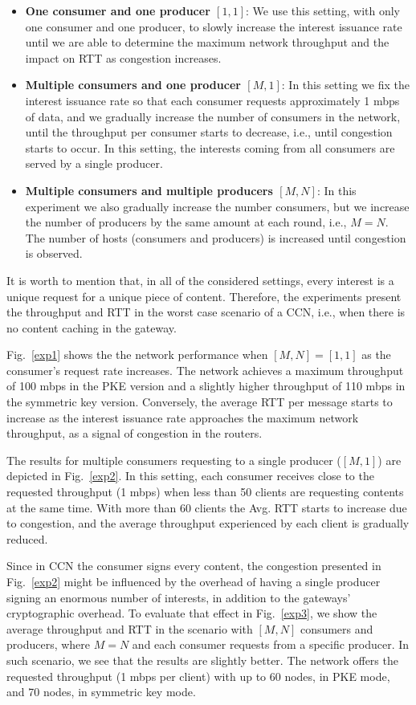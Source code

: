 \begin{itemize}
 \item \textbf{One consumer and one producer $[1,1]$}: We use this setting, with only one consumer and one producer, to slowly increase the interest issuance rate until we are able to determine the maximum network throughput and the impact on RTT as congestion increases.
 \item \textbf{Multiple consumers and one producer $[M,1]$}: In this setting we fix the interest issuance rate so that each consumer requests approximately 1 mbps of data, and we gradually increase the number of consumers in the network, until the throughput per consumer starts to decrease, i.e., until congestion starts to occur. In this setting, the interests coming from all consumers are served by a single producer.  
 \item \textbf{Multiple consumers and multiple producers $[M,N]$}: In this experiment we also gradually increase the number consumers, but we increase the number of producers by the same amount at each round, i.e., $M=N$. The number of hosts (consumers and producers) is increased until congestion is observed.
\end{itemize}

It is worth to mention that, in all of the considered settings, every interest is a unique request for a unique piece of content. Therefore, the experiments present the throughput and RTT in the worst case scenario of a CCN, i.e., when there is no content caching in the gateway.

Fig.~\ref{exp1} shows the the network performance when $[M,N]=[1,1]$ as the consumer's request rate increases. The network achieves a maximum throughput of 100 mbps in the PKE version and a
slightly higher throughput of 110 mbps in the symmetric key version. Conversely, the average RTT per message starts to increase as the interest issuance rate approaches the maximum network throughput, as a signal of congestion in the routers.

The results for multiple consumers requesting to a single producer ($[M,1]$) are depicted in Fig.~\ref{exp2}.
In this setting, each consumer receives close to the requested throughput (1 mbps) when less than 50 clients are requesting contents at the same time.
With more than 60 clients the Avg. RTT starts to increase due to congestion, and the average throughput experienced by each client is gradually reduced.

Since in CCN the consumer signs every content, the congestion presented in Fig.~\ref{exp2} might be influenced by the overhead of having a single producer signing an enormous number of interests, in addition to the gateways' cryptographic overhead.
To evaluate that effect in Fig.~\ref{exp3}, we show the average throughput and RTT in the scenario with $[M,N]$ consumers and producers, where $M=N$ and each consumer requests from a specific producer.
In such scenario, we see that the results are slightly better. The network offers the requested throughput (1 mbps per client) with up to 60 nodes, in PKE mode, and 70 nodes, in symmetric key mode.


